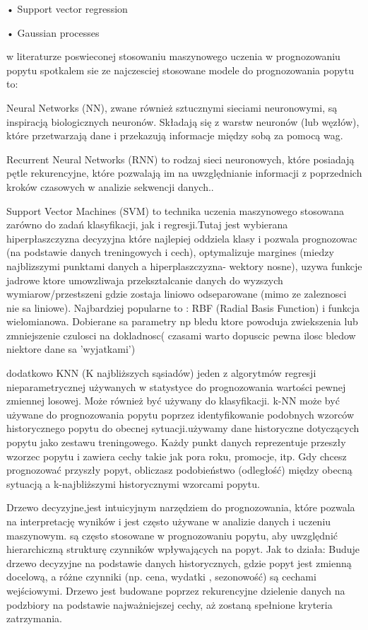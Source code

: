     • Support vector regression
    
    • Gaussian processes 
\cite{gen2023}


w literaturze poswieconej stosowaniu maszynowego uczenia w prognozowaniu popytu spotkalem sie ze najczesciej stosowane modele do prognozowania popytu to:

Neural Networks (NN), zwane również sztucznymi sieciami neuronowymi, są inspiracją biologicznych neuronów. Składają się z warstw neuronów (lub węzłów), które przetwarzają dane i przekazują informacje między sobą za pomocą wag.

Recurrent Neural Networks (RNN) to rodzaj sieci neuronowych, które posiadają pętle rekurencyjne, które pozwalają im na uwzględnianie informacji z poprzednich kroków czasowych w analizie sekwencji danych..

Support Vector Machines (SVM) to technika uczenia maszynowego stosowana zarówno do zadań klasyfikacji, jak i regresji.Tutaj jest wybierana hiperpłaszczyzna decyzyjna które najlepiej oddziela klasy i pozwala prognozowac (na podstawie danych treningowych i cech), optymalizuje margines (miedzy najblizszymi punktami danych a hiperplaszczyzna- wektory nosne), uzywa funkcje jadrowe ktore umowzliwaja przeksztalcanie danych do wyzszych wymiarow/przestszeni gdzie zostaja liniowo odseparowane (mimo ze zaleznosci nie sa liniowe). Najbardziej popularne to :  RBF (Radial Basis Function) i funkcja wielomianowa. Dobierane sa parametry np bledu ktore powoduja zwiekszenia lub zmniejszenie czulosci na dokladnosc( czasami warto dopuscic pewna ilosc bledow niektore dane sa 'wyjatkami')

dodatkowo  KNN (K najbliższych sąsiadów)  jeden z algorytmów regresji nieparametrycznej używanych w statystyce do prognozowania wartości pewnej zmiennej losowej. Może również być używany do klasyfikacji. k-NN może być używane do prognozowania popytu poprzez identyfikowanie podobnych wzorców historycznego popytu do obecnej sytuacji.używamy dane historyczne dotyczących popytu jako zestawu treningowego. Każdy punkt danych reprezentuje przeszły wzorzec popytu i zawiera cechy takie jak pora roku, promocje,  itp. Gdy chcesz prognozować przyszły popyt, obliczasz podobieństwo (odległość) między obecną sytuacją a k-najbliższymi historycznymi wzorcami popytu.

Drzewo decyzyjne,jest intuicyjnym narzędziem do prognozowania, które pozwala na interpretację wyników i jest często używane w analizie danych i uczeniu maszynowym. są często stosowane w prognozowaniu popytu, aby uwzględnić hierarchiczną strukturę czynników wpływających na popyt.
Jak to działa: Buduje drzewo decyzyjne na podstawie danych historycznych, gdzie popyt jest zmienną docelową, a różne czynniki (np. cena, wydatki , sezonowość) są cechami wejściowymi. Drzewo jest budowane poprzez rekurencyjne dzielenie danych na podzbiory na podstawie najważniejszej cechy, aż zostaną spełnione kryteria zatrzymania.

